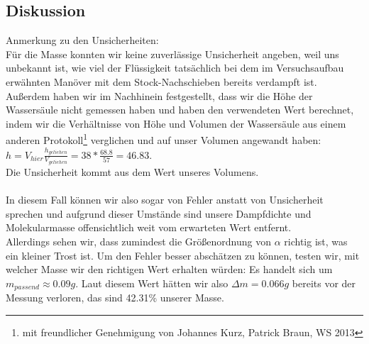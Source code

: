 \documentclass{article}
\begin{document}
\subsection{Diskussion}
Anmerkung zu den Unsicherheiten: \\
Für die Masse konnten wir keine zuverlässige Unsicherheit angeben, weil uns unbekannt ist, wie viel der Flüssigkeit tatsächlich bei dem im Versuchsaufbau erwähnten Manöver mit dem Stock-Nachschieben bereits verdampft ist. \\
Außerdem haben wir im Nachhinein festgestellt, dass wir die Höhe der Wassersäule nicht gemessen haben und haben den verwendeten Wert berechnet, indem wir die Verhältnisse von Höhe und Volumen der Wassersäule aus einem anderen Protokoll\footnote{mit freundlicher Genehmigung von Johannes Kurz, Patrick Braun, WS 2013} verglichen und auf unser Volumen angewandt haben: $h=V_{hier}\frac{h_{geliehen}}{V_{geliehen}}=38*\frac{68.8}{57}=46.83$. \\ 
Die Unsicherheit kommt aus dem Wert unseres Volumens.\\
\\
In diesem Fall können wir also sogar von Fehler anstatt von Unsicherheit sprechen und aufgrund dieser Umstände sind unsere Dampfdichte und Molekularmasse offensichtlich weit vom erwarteten Wert entfernt.\\
Allerdings sehen wir, dass zumindest die Größenordnung von $\alpha$ richtig ist, was ein kleiner Trost ist. Um den Fehler besser abschätzen zu können, testen wir, mit welcher Masse wir den richtigen Wert erhalten würden: Es handelt sich um $m_{passend}\approx 0.09g$. Laut diesem Wert hätten wir also $\Delta m=0.066g$ bereits vor der Messung verloren, das sind 42.31\% unserer Masse.\\
\end{document}
